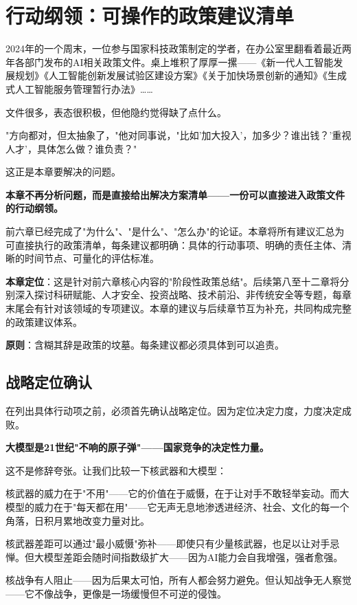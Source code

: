 \chapter{行动纲领：可操作的政策建议清单}

2024年的一个周末，一位参与国家科技政策制定的学者，在办公室里翻看着最近两年各部门发布的AI相关政策文件。桌上堆积了厚厚一摞——《新一代人工智能发展规划》《人工智能创新发展试验区建设方案》《关于加快场景创新的通知》《生成式人工智能服务管理暂行办法》……

文件很多，表态很积极，但他隐约觉得缺了点什么。

"方向都对，但太抽象了，"他对同事说，"比如'加大投入'，加多少？谁出钱？'重视人才'，具体怎么做？谁负责？"

这正是本章要解决的问题。

\textbf{本章不再分析问题，而是直接给出解决方案清单——一份可以直接进入政策文件的行动纲领。}

前六章已经完成了"为什么"、"是什么"、"怎么办"的论证。本章将所有建议汇总为可直接执行的政策清单，每条建议都明确：具体的行动事项、明确的责任主体、清晰的时间节点、可量化的评估标准。

\textbf{本章定位}：这是针对前六章核心内容的"阶段性政策总结"。后续第八至十二章将分别深入探讨科研赋能、人才安全、投资战略、技术前沿、非传统安全等专题，每章末尾会有针对该领域的专项建议。本章的建议与后续章节互为补充，共同构成完整的政策建议体系。

\textbf{原则}：含糊其辞是政策的坟墓。每条建议都必须具体到可以追责。

\section{战略定位确认}

在列出具体行动项之前，必须首先确认战略定位。因为定位决定力度，力度决定成败。

\textbf{大模型是21世纪"不响的原子弹"——国家竞争的决定性力量。}

这不是修辞夸张。让我们比较一下核武器和大模型：

核武器的威力在于"不用"——它的价值在于威慑，在于让对手不敢轻举妄动。而大模型的威力在于"每天都在用"——它无声无息地渗透进经济、社会、文化的每一个角落，日积月累地改变力量对比。

核武器差距可以通过"最小威慑"弥补——即使只有少量核武器，也足以让对手忌惮。但大模型差距会随时间指数级扩大——因为AI能力会自我增强，强者愈强。

核战争有人阻止——因为后果太可怕，所有人都会努力避免。但认知战争无人察觉——它不像战争，更像是一场缓慢但不可逆的侵蚀。

